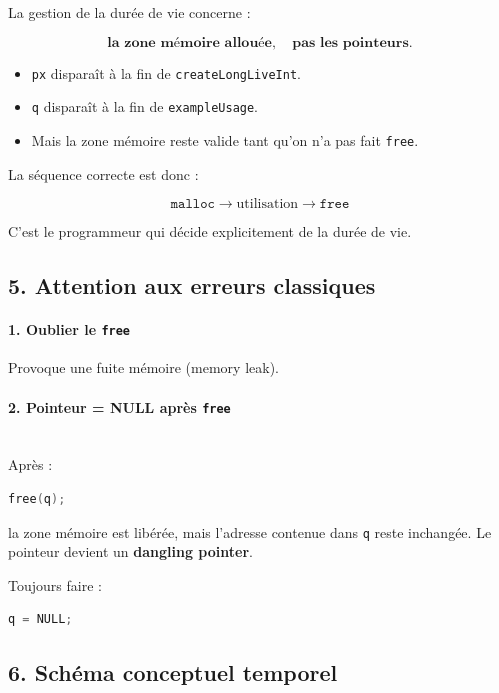 La gestion de la durée de vie concerne :

\[
\textbf{la zone mémoire allouée}, \quad \textbf{pas les pointeurs}.
\]

\begin{itemize}
    \item \texttt{px} disparaît à la fin de \texttt{createLongLiveInt}.
    \item \texttt{q} disparaît à la fin de \texttt{exampleUsage}.
    \item Mais la zone mémoire reste valide tant qu'on n'a pas fait \texttt{free}.
\end{itemize}

La séquence correcte est donc :

\[
\texttt{malloc} \rightarrow \text{utilisation} \rightarrow \texttt{free}
\]

C’est le programmeur qui décide explicitement de la durée de vie.

\subsection{5. Attention aux erreurs classiques}

\paragraph{1. Oublier le \texttt{free}}

Provoque une fuite mémoire (memory leak).

\paragraph{2. Pointeur = NULL après \texttt{free}}
\\
Après :
\begin{lstlisting}[language=C]
free(q);
\end{lstlisting}

la zone mémoire est libérée, mais l’adresse contenue dans \texttt{q}
reste inchangée. Le pointeur devient un \textbf{dangling pointer}.

Toujours faire :

\begin{lstlisting}[language=C]
q = NULL;
\end{lstlisting}

\subsection{6. Schéma conceptuel temporel}

